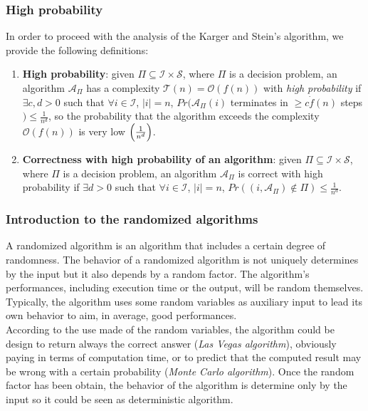 \subsubsection*{High probability}
In order to proceed with the analysis of the Karger and Stein's algorithm, we provide the following definitions:
\begin{enumerate}
    \item \textbf{High probability}: given $\Pi \subseteq \mathcal{I} \times \mathcal{S}$, where $\Pi$ is a decision problem, an algorithm $\mathcal{A}_{\Pi}$ has a complexity $\mathcal{T}(n) = \mathcal{O}(f(n))$ with \textit{high probability} if $\exists c, d > 0$ such that $\forall i \in \mathcal{I}$, $|i| = n$, $Pr(\mathcal{A}_{\Pi}(i)$ terminates in $\ge c \dot f(n)$ steps $) \le \frac{1}{n^d}$, so the probability that the algorithm exceeds the complexity $\mathcal{O}(f(n))$ is very low $\Bigl(\frac{1}{n^d}\Bigr)$.
    \item \textbf{Correctness with high probability of an algorithm}: given $\Pi \subseteq \mathcal{I} \times \mathcal{S}$, where $\Pi$ is a decision problem, 
    an algorithm $\mathcal{A}_{\Pi}$ is correct with high probability if $\exists d > 0$ such that $\forall i \in \mathcal{I}$, $|i| = n$, $Pr((i, \mathcal{A}_{\Pi}) \notin \Pi) \le \frac{1}{n^d}$.
\end{enumerate}

\subsubsection*{Introduction to the randomized algorithms}
A randomized algorithm is an algorithm that includes a certain degree of randomness. The behavior of a randomized algorithm is not uniquely determines by the input but it also depends by a random factor. The algorithm's performances, including execution time or the output, will be random themselves.\\ \noindent
Typically, the algorithm uses some random variables as auxiliary input to lead its own behavior to aim, in average, good performances. \\ \noindent
According to the use made of the random variables, the algorithm could be design to return always the correct answer (\textit{Las Vegas algorithm}), obviously paying in terms of computation time, or to predict that the computed result may be wrong with a certain probability (\textit{Monte Carlo algorithm}). Once the random factor has been obtain, the behavior of the algorithm is determine only by the input so it could be seen as deterministic algorithm.

